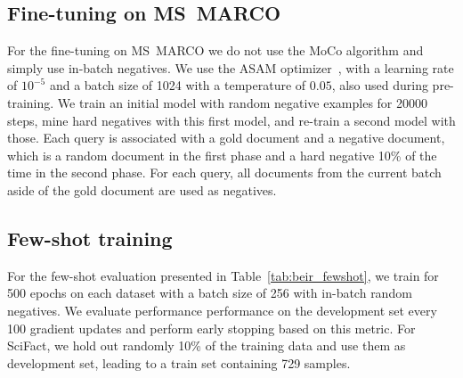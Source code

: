 \documentclass[10pt]{article} %
\begin{document}
\subsection{Fine-tuning on MS~MARCO}
\label{appendix:technical_finetuning}
For the fine-tuning on MS~MARCO we do not use the MoCo algorithm and simply use in-batch negatives. 
We use the ASAM optimizer~\citep{asam}, with a learning rate of $10^{-5}$ and a batch size of 1024 with a temperature of $0.05$, also used during pre-training.
We train an initial model with random negative examples for 20000 steps, mine hard negatives with this first model, and re-train a second model with those.
Each query is associated with a gold document and a negative document, which is a random document in the first phase and a hard negative 10\% of the time in the second phase.
For each query, all documents from the current batch aside of the gold document are used as negatives.

\subsection{Few-shot training}
\label{appendix:technical_fewshot}
For the few-shot evaluation presented in Table~\ref{tab:beir_fewshot}, we train for 500 epochs on each dataset with a batch size of 256 with in-batch random negatives.
We evaluate performance performance on the development set every 100 gradient updates and perform early stopping based on this metric.
For SciFact, we hold out randomly 10\% of the training data and use them as development set, leading to a train set containing 729 samples. 
\end{document}
